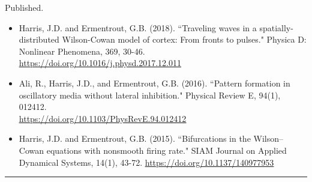 \documentclass[a4paper,10pt]{article}
\newlength{\cvcolumngapwidth}
\newlength{\cvleftcolumnwidth}
\newlength{\cvrightcolumnwidth}
\newcommand{\cvsectionstyle}[1]{{\normalsize\cvsectionfont\textcolor{cvsectioncolor}{#1}}}
\newcommand{\cvtitlestyle}[1]{{\large\cvtitlefont\textcolor{cvtitlecolor}{#1}}}
\newcommand{\cvdurationstyle}[1]{{\small\cvdurationfont\textcolor{cvdurationcolor}{#1}}}
\newlength{\cvafteritemskipamount}
\newlength{\cvaftersectionskipamount}
\newlength{\cvbetweensectionandheadingextraskipamount}
\newlength{\cvaftertitleskipamount}
\newlength{\cvparskip}
\newcommand{\cvsection}[1]{
    \begin{minipage}[t]{\cvleftcolumnwidth}
        \raggedleft\cvsectionstyle{#1}
    \end{minipage}%
    \hspace{\cvcolumngapwidth}%
    \begin{minipage}[t]{\cvrightcolumnwidth}
        \textcolor{cvrulecolor}{\rule{\cvrightcolumnwidth}{0.3mm}}
    \end{minipage}

    \vspace{\cvaftersectionskipamount}
}
\newcommand{\cvitem}[2]{
    \begin{minipage}[t]{\cvleftcolumnwidth}
        \raggedleft #1
    \end{minipage}%
    \hspace{\cvcolumngapwidth}%
    \begin{minipage}[t]{\cvrightcolumnwidth}
        \setlength{\parskip}{\cvparskip} #2
    \end{minipage}

    \vspace{\cvafteritemskipamount}
}
\newcommand{\cvtitle}[1]{
    \cvtitlestyle{#1}

    \vspace{\cvaftertitleskipamount}
    \vspace{-\cvparskip}
}
\begin{document}
\cvitem{
    \cvdurationstyle{Published.}
}{
    \begin{itemize}[leftmargin=*]
        \item  Harris, J.D. and Ermentrout, G.B. (2018). ``Traveling waves in a spatially-distributed Wilson-Cowan model of cortex: From fronts to pulses." Physica D: Nonlinear Phenomena, 369, 30-46. \href{https://doi.org/10.1016/j.physd.2017.12.011}{\underline{https://doi.org/10.1016/j.physd.2017.12.011}} \\
        \item Ali, R., Harris, J.D., and Ermentrout, G.B. (2016). ``Pattern formation in oscillatory media without lateral inhibition." Physical Review E, 94(1), 012412. \\ \href{https://doi.org/10.1103/PhysRevE.94.012412}{\underline{https://doi.org/10.1103/PhysRevE.94.012412}} \\
        \item Harris, J.D. and Ermentrout, G.B. (2015). ``Bifurcations in the Wilson--Cowan equations with nonsmooth firing rate." SIAM Journal on Applied Dynamical Systems, 14(1), 43-72. \href{https://doi.org/10.1137/140977953}{\underline{https://doi.org/10.1137/140977953}}
    \end{itemize}
}


\cvsection{PRESENTATIONS}
\vspace{\cvbetweensectionandheadingextraskipamount}
\end{document}
